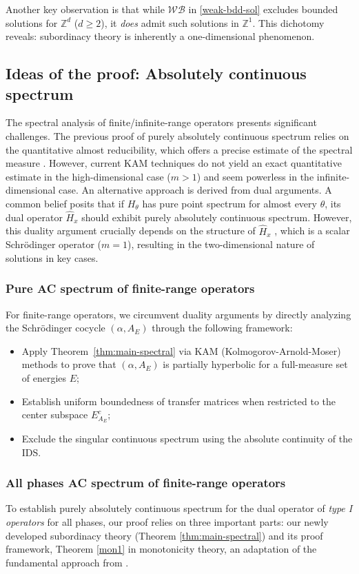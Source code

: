 \documentclass[11pt]{amsart}
\theoremstyle{remark}
\theoremstyle{definition}
\begin{document}
Another key observation is that 
while $\mathcal{WB}$ in \eqref{weak-bdd-sol} excludes bounded solutions for $\mathbb{Z}^d$ ($d \geq 2$), it \emph{does} admit such solutions in $\mathbb{Z}^1$. This dichotomy reveals:
subordinacy theory is inherently a one-dimensional phenomenon. 

\subsection{Ideas of the proof: Absolutely continuous spectrum}\label{idea3}
The spectral analysis of finite/infinite-range operators presents significant challenges.  The previous proof of  purely absolutely continuous spectrum relies on the quantitative almost reducibility, which offers a precise estimate of the spectral measure \cite{Avila: ac, Eli92}. However, current KAM techniques do not yield an exact quantitative estimate in the high-dimensional case ($m>1$) and seem powerless in the infinite-dimensional case. An alternative approach is derived from dual arguments. A common belief posits that if $H_\theta$ has pure point spectrum for almost every $\theta$, its dual operator $\widehat{H}_x$ should exhibit purely absolutely continuous spectrum. However, this duality argument crucially depends on the structure of $\widehat{H}_x$ \cite{BJ,DF2,J1999}, which is a scalar Schr\"odinger operator ($m=1$), resulting in the two-dimensional nature of solutions in key cases. 

\subsubsection{Pure AC spectrum of finite-range operators}
For finite-range operators, we circumvent duality arguments by directly analyzing the Schr\"odinger cocycle \((\alpha, A_E)\) through the following framework:  
\begin{itemize}
    \item Apply Theorem~\ref{thm:main-spectral} via KAM (Kolmogorov-Arnold-Moser) methods to prove that \((\alpha, A_E)\) is partially hyperbolic for a full-measure set of energies \(E\);
    \item Establish uniform boundedness of transfer matrices when restricted to the center subspace \(E^c_{A_E}\);
    \item Exclude the singular continuous spectrum using the absolute continuity of the IDS.
\end{itemize}


\subsubsection{All phases AC spectrum of finite-range operators}\label{all-ac}
To establish purely absolutely continuous spectrum for the dual operator of \textit{type I operators} for all phases, our proof relies on three important parts:  our newly developed subordinacy theory (Theorem \ref{thm:main-spectral}) and its proof framework,  Theorem \ref{mon1} in monotonicity theory, an adaptation of the fundamental approach from \cite{Avila: ac}.
\end{document}
